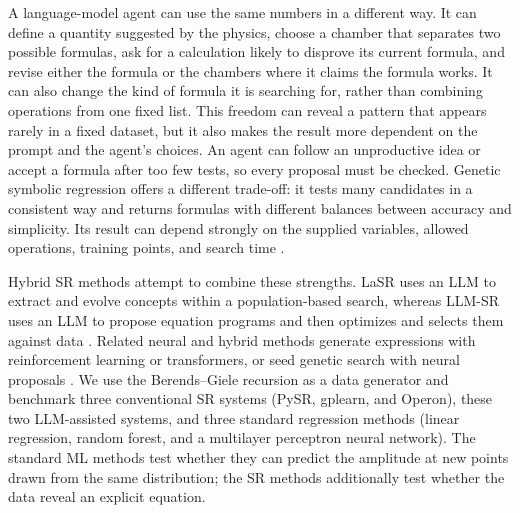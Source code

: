 \documentclass{article}
\begin{document}
A language-model agent can use the same numbers in a different way. It can
define a quantity suggested by the physics, choose a chamber that separates
two possible formulas, ask for a calculation likely to disprove its current
formula, and revise either the formula or the chambers where it claims the
formula works. It can also change the kind of formula it is searching for,
rather than combining operations from one fixed list. This freedom can reveal
a pattern that appears rarely in a fixed dataset, but it also makes the result
more dependent on the prompt and the agent's choices. An agent can follow an
unproductive idea or accept a formula after too few tests, so every proposal
must be checked. Genetic symbolic regression offers a different trade-off: it
tests many candidates in a consistent way and returns formulas with different
balances between accuracy and simplicity. Its result can depend strongly on
the supplied variables, allowed operations, training points, and search time
\citep{Udrescu2020AIFeynman,Cranmer2023InterpretableML}.

Hybrid SR methods attempt to combine these strengths. LaSR uses an LLM to
extract and evolve concepts within a population-based search, whereas LLM-SR
uses an LLM to propose equation programs and then optimizes and selects them
against data
\citep{Grayeli2024SymbolicRW,Shojaee2024LLMSRSE}. Related neural and hybrid
methods generate expressions with reinforcement learning or transformers, or
seed genetic search with neural proposals
\citep{Petersen2019DeepSR,Valipour2021SymbolicGPT,Mundhenk2021NeuralGuidedGP}.
We use the
Berends--Giele recursion as a data generator and benchmark three conventional
SR systems (PySR, gplearn, and Operon), these two LLM-assisted systems, and
three standard regression methods (linear regression, random forest, and a
multilayer perceptron neural network). The standard ML methods test whether
they can predict the amplitude at new points drawn from the same distribution; the
SR methods additionally test whether the data reveal an explicit equation.
\end{document}
